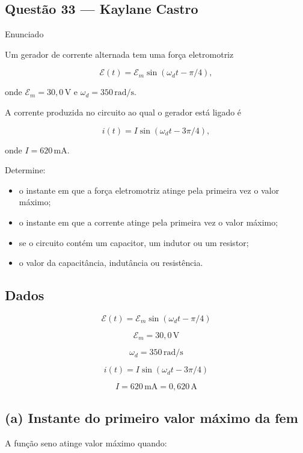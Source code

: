 \documentclass[12pt,a4paper]{article}
\begin{document}
\vspace{0.2cm}

\subsection*{Questão 33 — Kaylane Castro}


{Enunciado}

Um gerador de corrente alternada tem uma força eletromotriz

\[
\mathcal{E}(t)=\mathcal{E}_m\sin(\omega_d t-\pi/4),
\]

onde $\mathcal{E}_m = 30,0\,\text{V}$ e
$\omega_d = 350\,\text{rad/s}$.

A corrente produzida no circuito ao qual o gerador está ligado é

\[
i(t)=I\sin(\omega_d t-3\pi/4),
\]

onde $I=620\,\text{mA}$.

Determine:

\begin{itemize}
    \item[(a)] o instante em que a força eletromotriz atinge pela primeira vez o valor máximo;
    \item[(b)] o instante em que a corrente atinge pela primeira vez o valor máximo;
    \item[(c)] se o circuito contém um capacitor, um indutor ou um resistor;
    \item[(d)] o valor da capacitância, indutância ou resistência.
\end{itemize}

\subsection*{Dados}

\[
\mathcal{E}(t)=\mathcal{E}_m\sin(\omega_d t-\pi/4)
\]

\[
\mathcal{E}_m = 30,0\,\text{V}
\]

\[
\omega_d = 350\,\text{rad/s}
\]

\[
i(t)=I\sin(\omega_d t-3\pi/4)
\]

\[
I = 620\,\text{mA} = 0,620\,\text{A}
\]


\subsection*{(a) Instante do primeiro valor máximo da fem}

A função seno atinge valor máximo quando:
\end{document}
